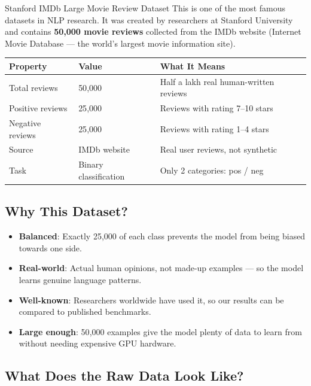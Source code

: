\documentclass[12pt, a4paper]{article}
\begin{document}
\begin{keyterm}{Stanford IMDb Large Movie Review Dataset}
This is one of the most famous datasets in NLP research. It was created by researchers at Stanford University and contains \textbf{50{,}000 movie reviews} collected from the IMDb website (Internet Movie Database — the world's largest movie information site).

\begin{center}
\begin{tabular}{lll}
\toprule
\textbf{Property} & \textbf{Value} & \textbf{What It Means} \\
\midrule
Total reviews & 50{,}000 & Half a lakh real human-written reviews \\
Positive reviews & 25{,}000 & Reviews with rating 7--10 stars \\
Negative reviews & 25{,}000 & Reviews with rating 1--4 stars \\
Source & IMDb website & Real user reviews, not synthetic \\
Task & Binary classification & Only 2 categories: pos / neg \\
\bottomrule
\end{tabular}
\end{center}
\end{keyterm}

\subsection{Why This Dataset?}

\begin{whybox}
\begin{itemize}
  \item \textbf{Balanced}: Exactly 25{,}000 of each class prevents the model from being biased towards one side.
  \item \textbf{Real-world}: Actual human opinions, not made-up examples — so the model learns genuine language patterns.
  \item \textbf{Well-known}: Researchers worldwide have used it, so our results can be compared to published benchmarks.
  \item \textbf{Large enough}: 50{,}000 examples give the model plenty of data to learn from without needing expensive GPU hardware.
\end{itemize}
\end{whybox}

\subsection{What Does the Raw Data Look Like?}
\end{document}
